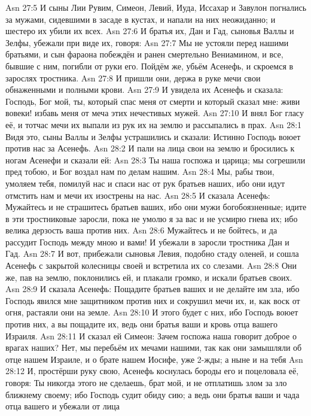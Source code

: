 \vs Asn 27:5
И сыны Лии Рувим, Симеон,
Левий, Иуда, Иссахар и Завулон погнались за мужами, сидевшими в засаде в
кустах, и напали на них неожиданно; и шестеро их убили их всех.
\vs Asn 27:6
И братья их, Дан и Гад,
сыновья Валлы и Зелфы, убежали при виде их, говоря:
\vs Asn 27:7
Мы не устояли перед нашими
братьями, и сын фараона побеждён и ранен смертельно Вениамином,
и все, бывшие с ним, погибли от руки его.
Пойдём же, убьём Асенефь, и скроемся в зарослях тростника.
\vs Asn 27:8
И пришли они, держа в руке
мечи свои обнаженными и полными крови.
\vs Asn 27:9
И увидела их Асенефь и
сказала: Господь, Бог мой, ты, который спас меня от смерти и который сказал
мне: живи вовеки! избавь меня от меча этих нечестивых мужей.
\vs Asn 27:10
И внял Бог гласу её, и
тотчас мечи их выпали из рук их на землю и рассыпались в прах.
\vs Asn 28:1
Видя это, сыны Валлы и Зелфы
устрашились и сказали: Истинно Господь воюет против нас за Асенефь.
\vs Asn 28:2
И пали на лица свои на землю
и бросились к ногам Асенефи и сказали ей:
\vs Asn 28:3
Ты наша госпожа и царица;
мы согрешили пред тобою, и Бог воздал нам по делам нашим.
\vs Asn 28:4
Мы, рабы твои, умоляем тебя,
помилуй нас и спаси нас от рук братьев наших, ибо они идут отмстить нам и мечи
их изострены на нас.
\vs Asn 28:5
И сказала Асенефь:
Мужайтесь и не страшитесь братьев ваших, ибо они мужи богобоязненные; идите в
эти тростниковые заросли, пока не умолю я за вас и не усмирю гнева их; ибо
велика дерзость ваша против них.
\vs Asn 28:6
Мужайтесь и не бойтесь, и да
рассудит Господь между мною и вами! И убежали в заросли тростника Дан и Гад.
\vs Asn 28:7
И вот, прибежали сыновья
Левия, подобно стаду оленей, и сошла Асенефь с закрытой колесницы своей и
встретила их со слезами.
\vs Asn 28:8
Они же, пав на землю,
поклонились ей, и плакали громко, и искали братьев своих.
\vs Asn 28:9
И сказала Асенефь: Пощадите
братьев ваших и не делайте им зла, ибо Господь явился мне защитником против них
и сокрушил мечи их, и, как воск от огня, растаяли они на земле.
\vs Asn 28:10
И этого будет с них, ибо
Господь воюет против них, а вы пощадите их, ведь они братья ваши и кровь отца
вашего Израиля.
\vs Asn 28:11
И сказал ей Симеон: Зачем
госпожа наша говорит доброе о врагах наших? Нет, мы перебьём их мечами нашими,
так как они замышляли об отце нашем Израиле,
и о брате нашем Иосифе, уже 2-жды;
а ныне и на тебя
\vs Asn 28:12
И, простёрши руку свою,
Асенефь коснулась бороды его и поцеловала её, говоря: Ты никогда этого не
сделаешь, брат мой, и не отплатишь злом за зло ближнему своему; ибо Господь
судит обиду сию; а ведь они братья ваши и чада отца вашего и убежали от лица
